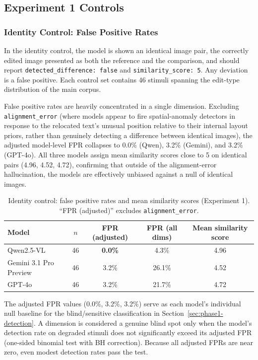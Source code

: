 \subsection{Experiment 1 Controls} \label{sec:exp1-controls}

\subsubsection{Identity Control: False Positive Rates}

In the identity control, the model is shown an identical image pair, the correctly edited image presented as both the reference and the comparison, and should report \texttt{detected\_difference: false} and \texttt{similarity\_score: 5}. Any deviation is a false positive. Each control set contains 46 stimuli spanning the edit-type distribution of the main corpus.

False positive rates are heavily concentrated in a single dimension. Excluding \texttt{alignment\_error} (where models appear to fire spatial-anomaly detectors in response to the relocated text's unusual position relative to their internal layout priors, rather than genuinely detecting a difference between identical images), the adjusted model-level FPR collapses to 0.0\% (Qwen), 3.2\% (Gemini), and 3.2\% (GPT-4o). All three models assign mean similarity scores close to 5 on identical pairs (4.96, 4.52, 4.72), confirming that outside of the alignment-error hallucination, the models are effectively unbiased against a null of identical images.

\begin{table}[htbp]
\centering
\caption{Identity control: false positive rates and mean similarity scores (Experiment 1). ``FPR (adjusted)'' excludes \texttt{alignment\_error}.}
\label{tab:identity-control}
\begin{tabular}{lcccc}
\toprule
Model & $n$ & FPR (adjusted) & FPR (all dims) & Mean similarity score \\
\midrule
Qwen2.5-VL              & 46 & \textbf{0.0\%} & 4.3\%  & 4.96 \\
Gemini 3.1 Pro Preview  & 46 &  3.2\%          & 26.1\% & 4.52 \\
GPT-4o                  & 46 &  3.2\%          & 21.7\% & 4.72 \\
\bottomrule
\end{tabular}
\end{table}

The adjusted FPR values (0.0\%, 3.2\%, 3.2\%) serve as each model's individual null baseline for the blind/sensitive classification in Section~\ref{sec:phase1-detection}. A dimension is considered a genuine blind spot only when the model's detection rate on degraded stimuli does not significantly exceed its adjusted FPR (one-sided binomial test with BH correction). Because all adjusted FPRs are near zero, even modest detection rates pass the test.

